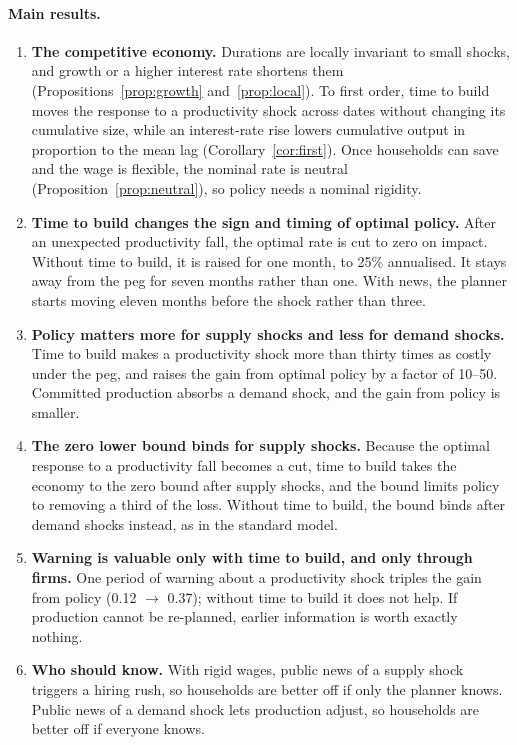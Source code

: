 \documentclass[11pt]{article}
\theoremstyle{definition}
\begin{document}
\paragraph{Main results.}
\begin{enumerate}
  \item \textbf{The competitive economy.} Durations are locally invariant to small shocks, and
        growth or a higher interest rate shortens them (Propositions~\ref{prop:growth}
        and~\ref{prop:local}). To first order, time to build moves the response to a productivity
        shock across dates without changing its cumulative size, while an interest-rate rise
        lowers cumulative output in proportion to the mean lag (Corollary~\ref{cor:first}). Once
        households can save and the wage is flexible, the nominal rate is neutral
        (Proposition~\ref{prop:neutral}), so policy needs a nominal rigidity.
  \item \textbf{Time to build changes the sign and timing of optimal policy.} After an
        unexpected productivity fall, the optimal rate is cut to zero on impact. Without time to
        build, it is raised for one month, to 25\% annualised. It stays away from the peg for seven
        months rather than one. With news, the planner starts moving eleven months before the shock
        rather than three.
  \item \textbf{Policy matters more for supply shocks and less for demand shocks.} Time to build
        makes a productivity shock more than thirty times as costly under the peg, and raises the
        gain from optimal policy by a factor of 10--50. Committed production absorbs a demand shock,
        and the gain from policy is smaller.
  \item \textbf{The zero lower bound binds for supply shocks.} Because the optimal response to a
        productivity fall becomes a cut, time to build takes the economy to the zero bound after
        supply shocks, and the bound limits policy to removing a third of the loss. Without time to
        build, the bound binds after demand shocks instead, as in the standard model.
  \item \textbf{Warning is valuable only with time to build, and only through firms.} One period
        of warning about a productivity shock triples the gain from policy (0.12 $\to$ 0.37); without
        time to build it does not help. If production cannot be re-planned, earlier information
        is worth exactly nothing.
  \item \textbf{Who should know.} With rigid wages, public news of a supply shock triggers a
        hiring rush, so households are better off if only the planner knows. Public news of a
        demand shock lets production adjust, so households are better off if everyone knows.
\end{enumerate}
\end{document}
